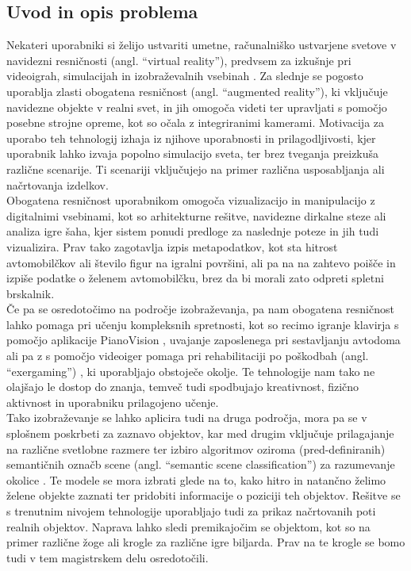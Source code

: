 \documentclass[a4paper, 12pt]{article}
\begin{document}
\subsection{Uvod in opis problema}
Nekateri uporabniki si želijo ustvariti umetne, računalniško ustvarjene svetove v navidezni resničnosti (angl. ``virtual reality''), predvsem za izkušnje pri videoigrah, simulacijah in izobraževalnih vsebinah \cite{Qingtian2024}. Za slednje se pogosto uporablja zlasti obogatena resničnost (angl. ``augmented reality''), ki vključuje navidezne objekte v realni svet, in jih omogoča videti ter upravljati s pomočjo posebne strojne opreme, kot so očala z integriranimi kamerami.
Motivacija za uporabo teh tehnologij izhaja iz njihove uporabnosti in prilagodljivosti, kjer uporabnik lahko izvaja popolno simulacijo sveta, ter brez tveganja preizkuša različne scenarije. Ti scenariji vključujejo na primer različna usposabljanja ali načrtovanja izdelkov. \\ Obogatena resničnost uporabnikom omogoča vizualizacijo in manipulacijo z digitalnimi vsebinami, kot so arhitekturne rešitve, navidezne dirkalne steze ali analiza igre šaha, kjer sistem ponudi predloge za naslednje poteze in jih tudi vizualizira. Prav tako zagotavlja izpis metapodatkov, kot sta hitrost avtomobilčkov ali število figur na igralni površini, ali pa na na zahtevo poišče in izpiše podatke o želenem avtomobilčku, brez da bi morali zato odpreti spletni brskalnik.\\
Če pa se osredotočimo na področje izobraževanja, pa nam obogatena resničnost lahko pomaga pri učenju kompleksnih spretnosti, kot so recimo igranje klavirja s pomočjo aplikacije PianoVision \cite{McKenzie2022PianoVision}, uvajanje zaposlenega pri sestavljanju avtodoma ali pa z s pomočjo videoiger pomaga pri  rehabilitaciji po poškodbah (angl. ``exergaming'') \cite{Chow2023Exergaming}, ki uporabljajo obstoječe okolje. Te tehnologije nam tako ne olajšajo le dostop do znanja, temveč tudi spodbujajo kreativnost, fizično aktivnost in uporabniku prilagojeno učenje.\\
Tako izobraževanje se lahko aplicira tudi na druga področja, mora pa se v splošnem poskrbeti za zaznavo objektov, kar med drugim vključuje prilagajanje na različne svetlobne razmere ter izbiro algoritmov oziroma (pred-definiranih) semantičnih označb scene (angl. ``semantic scene classification'') za razumevanje okolice \cite{MetaDevelopers2024}. Te modele se mora izbrati glede na to, kako hitro in natančno želimo želene objekte zaznati ter pridobiti informacije o poziciji teh objektov. Rešitve se s trenutnim nivojem tehnologije uporabljajo tudi za prikaz načrtovanih poti realnih objektov. Naprava lahko sledi premikajočim se objektom, kot so na primer različne žoge ali krogle za različne igre biljarda. Prav na te krogle se bomo tudi v tem magistrskem delu osredotočili. \\ 
\end{document}
